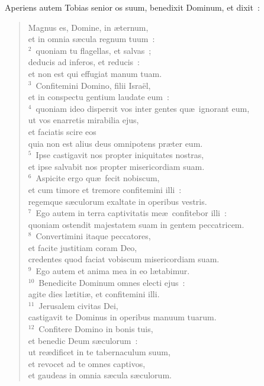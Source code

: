 \lettrine[lines=10,image=true,loversize=0.05,lraise=-0.03]{A}{}periens autem Tobias senior os suum, benedixit Dominum, et dixit~: \begin{flushleft}\begin{verse}\vspace{6pt}Magnus es, Domine, in \ae ternum,\\ et in omnia s\ae cula regnum tuum~:\\
${}^{2}$~quoniam tu flagellas, et salvas~;\\ deducis ad inferos, et reducis~:\\ et non est qui effugiat manum tuam.\\
${}^{3}$~Confitemini Domino, filii Isra\"el,\\ et in conspectu gentium laudate eum~:\\
${}^{4}$~quoniam ideo dispersit vos inter gentes qu\ae\ ignorant eum,\\ ut vos enarretis mirabilia ejus,\\ et faciatis scire eos\\ quia non est alius deus omnipotens pr\ae ter eum.\\
${}^{5}$~Ipse castigavit nos propter iniquitates nostras,\\ et ipse salvabit nos propter misericordiam suam.\\
${}^{6}$~Aspicite ergo qu\ae\ fecit nobiscum,\\ et cum timore et tremore confitemini illi~:\\ regemque s\ae culorum exaltate in operibus vestris.\\
${}^{7}$~Ego autem in terra captivitatis me\ae\ confitebor illi~:\\ quoniam ostendit majestatem suam in gentem peccatricem.\\
${}^{8}$~Convertimini itaque peccatores,\\ et facite justitiam coram Deo,\\ credentes quod faciat vobiscum misericordiam suam.\\
${}^{9}$~Ego autem et anima mea in eo l\ae tabimur.\\
${}^{10}$~Benedicite Dominum omnes electi ejus~:\\ agite dies l\ae titi\ae , et confitemini illi.\\
${}^{11}$~Jerusalem civitas Dei,\\ castigavit te Dominus in operibus manuum tuarum.\\
${}^{12}$~Confitere Domino in bonis tuis,\\ et benedic Deum s\ae culorum~:\\ ut re\ae dificet in te tabernaculum suum,\\ et revocet ad te omnes captivos,\\ et gaudeas in omnia s\ae cula s\ae culorum.\\

\end{verse}
\end{flushleft}
